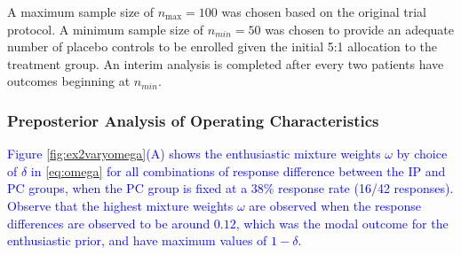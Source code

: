 \documentclass[AMA,STIX1COL,doublespace]{WileyNJD-v2}
\begin{document}

A maximum sample size of $n_{\text{max}}=100$ was chosen based on the original trial protocol.
%
A minimum sample size of $n_{min}=50$ was chosen to provide an adequate number of placebo controls to be enrolled given the initial 5:1 allocation to the treatment group.
%
An interim analysis is completed after every two patients have outcomes beginning at $n_{min}$.

\subsubsection{Preposterior Analysis of Operating Characteristics}\label{sec:ex2operatingcharacteristics} 
\textcolor{blue}{Figure \ref{fig:ex2varyomega}(A) shows the enthusiastic mixture weights $\omega$ by choice of $\delta$ in \eqref{eq:omega} for all combinations of response difference between the IP and PC groups, when the PC group is fixed at a 38\% response rate (16/42 responses). Observe that the highest mixture weights $\omega$ are observed when the response differences are observed to be around $0.12$, which was the modal outcome for the enthusiastic prior, and have maximum values of $1-\delta$.}
\end{document}

